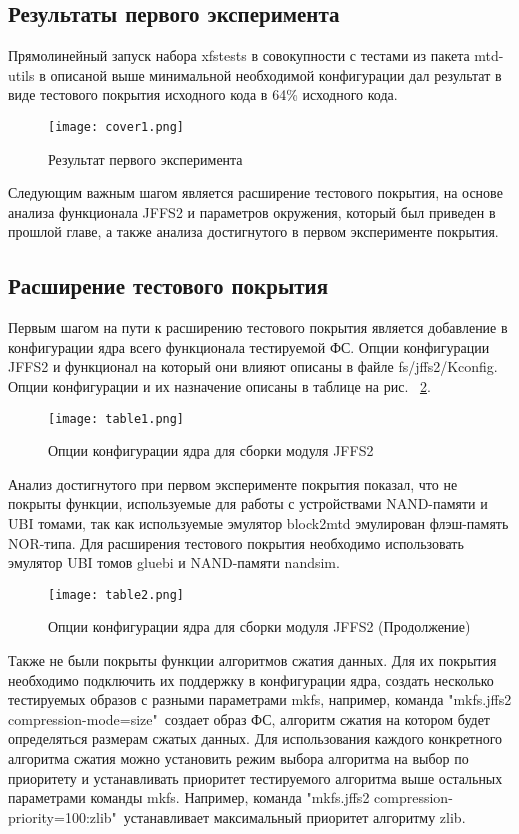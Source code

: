 \subsection{Результаты первого эксперимента}

Прямолинейный запуск набора xfstests в совокупности с тестами из пакета mtd-utils в описаной выше минимальной необходимой конфигурации дал результат в виде тестового покрытия исходного кода в 64\% исходного кода. 

\begin{figure}[H]
	\centering
	\texttt{[image: cover1.png]}
	\caption{Результат первого эксперимента}
	\label{cover1}
\end{figure} 

Следующим важным шагом является расширение тестового покрытия, на основе анализа функционала JFFS2 и параметров окружения, который был приведен в прошлой главе, а также анализа достигнутого в первом эксперименте покрытия. 

\subsection{Расширение тестового покрытия}

Первым шагом на пути к расширению тестового покрытия является добавление в конфигурации ядра всего функционала тестируемой ФС. Опции конфигурации JFFS2 и функционал на который они влияют описаны в файле fs/jffs2/Kconfig. Опции конфигурации и их назначение описаны в таблице на рис. ~\ref{table1}.

\begin{figure}[H]
	\centering
	\texttt{[image: table1.png]}
	\caption{Опции конфигурации ядра для сборки модуля JFFS2}
	\label{table1}
\end{figure}

Анализ достигнутого при первом эксперименте покрытия показал, что не покрыты функции, используемые для работы с устройствами NAND-памяти и UBI томами, так как используемые эмулятор block2mtd эмулирован флэш-память NOR-типа. Для расширения тестового покрытия необходимо использовать эмулятор UBI томов gluebi и NAND-памяти nandsim.

\begin{figure}[H]
	\centering
	\texttt{[image: table2.png]}
	\caption{Опции конфигурации ядра для сборки модуля JFFS2 (Продолжение)}
	\label{table2}
\end{figure}

Также не были покрыты функции алгоритмов сжатия данных. Для их покрытия необходимо подключить их поддержку в конфигурации ядра, создать несколько тестируемых образов с разными параметрами mkfs, например, команда "mkfs.jffs2 \-\-compression-mode=size"\ создает образ ФС, алгоритм сжатия на котором будет определяться размерам сжатых данных. Для использования каждого конкретного алгоритма сжатия можно установить режим выбора алгоритма на выбор по приоритету и устанавливать приоритет тестируемого алгоритма выше остальных параметрами команды mkfs. Например, команда "mkfs.jffs2 \-\-compression-priority=100:zlib"\ устанавливает максимальный приоритет алгоритму zlib.

